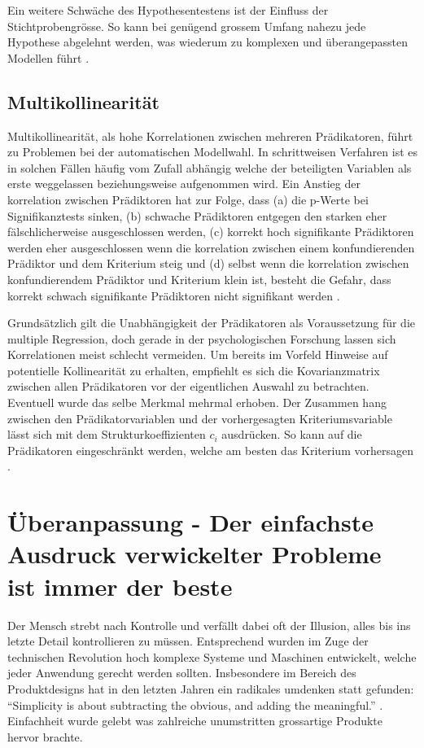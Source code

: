 \documentclass[english,12pt,doc]{apa}
\begin{document}
Ein weitere Schwäche des Hypothesentestens ist der Einfluss der Stichtprobengrösse. So kann bei genügend grossem Umfang nahezu jede Hypothese abgelehnt werden, was wiederum zu komplexen und überangepassten Modellen führt \cite[p.173]{weakliem2004introduction}.

\subsection{Multikollinearität}
Multikollinearität, als hohe Korrelationen zwischen mehreren Prädikatoren, führt zu Problemen bei der automatischen Modellwahl. 
In schrittweisen Verfahren ist es in solchen Fällen häufig vom Zufall abhängig welche der beteiligten Variablen als erste weggelassen beziehungsweise aufgenommen wird. 
Ein Anstieg der  korrelation zwischen Prädiktoren hat zur Folge, dass (a) die p-Werte bei Signifikanztests sinken, (b) schwache Prädiktoren entgegen den starken eher fälschlicherweise ausgeschlossen werden, (c) korrekt hoch signifikante Prädiktoren werden eher ausgeschlossen wenn die korrelation zwischen einem konfundierenden Prädiktor und dem Kriterium steig und (d) selbst wenn die korrelation zwischen konfundierendem Prädiktor und Kriterium klein ist, besteht die Gefahr, dass korrekt schwach signifikante Prädiktoren nicht signifikant werden \cite[p. 2810]{graham2003confronting}.

Grundsätzlich gilt die Unabhängigkeit der Prädikatoren als Voraussetzung für die multiple Regression, doch gerade in der psychologischen Forschung lassen sich Korrelationen meist schlecht vermeiden.
Um bereits im Vorfeld Hinweise auf potentielle Kollinearität zu erhalten, empfiehlt es sich die Kovarianzmatrix zwischen allen Prädikatoren vor der eigentlichen Auswahl zu betrachten.
Eventuell wurde das selbe Merkmal mehrmal erhoben.
Der Zusammen hang zwischen den Prädikatorvariablen und der vorhergesagten Kriteriumsvariable lässt sich mit dem Strukturkoeffizienten $c_i$ ausdrücken. So kann auf die Prädikatoren eingeschränkt werden,  welche am besten das Kriterium vorhersagen \cite[S. 453]{bortz2011}. 

\section{Überanpassung - Der einfachste Ausdruck verwickelter Probleme ist immer der beste}
\label{sparsamkeit}
Der Mensch strebt nach Kontrolle und verfällt dabei oft der Illusion, alles bis ins letzte Detail kontrollieren zu müssen.
Entsprechend wurden im Zuge der technischen Revolution hoch komplexe Systeme und Maschinen entwickelt, welche jeder Anwendung gerecht werden sollten. 
Insbesondere im Bereich des Produktdesigns hat in den letzten Jahren ein radikales umdenken statt gefunden: ``Simplicity is about subtracting the obvious, and adding the meaningful.'' \cite{maeda2006laws}. Einfachheit wurde gelebt was zahlreiche unumstritten grossartige Produkte hervor brachte. 
\end{document}
